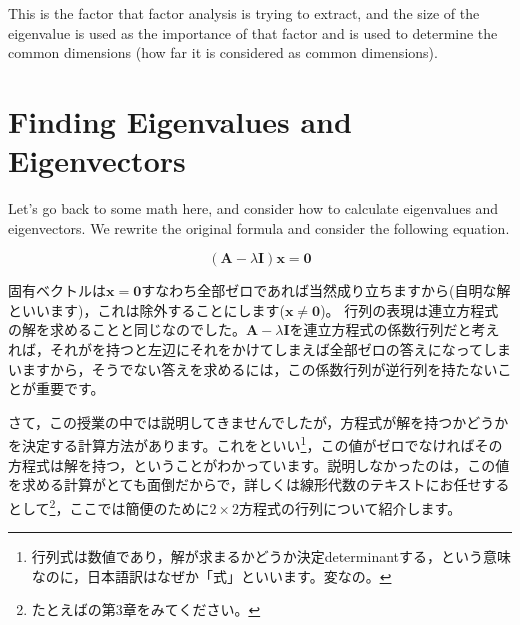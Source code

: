 \documentclass{ltjsbook}
\begin{document}
This is the factor that factor analysis is trying to extract, and the size of the eigenvalue is used as the importance of that factor and is used to determine the common dimensions (how far it is considered as common dimensions).

\section{Finding Eigenvalues and Eigenvectors}
Let's go back to some math here, and consider how to calculate eigenvalues and eigenvectors.
We rewrite the original formula and consider the following equation.

\[ (\bm{A} - \lambda\bm{I})\bm{x} = \bm{0} \]

固有ベクトルは$\bm{x}=\bm{0}$すなわち全部ゼロであれば当然成り立ちますから(自明な解といいます)，これは除外することにします($\bm{x}\neq \bm{0}$)。
行列の表現は連立方程式の解を求めることと同じなのでした。$\bm{A} - \lambda\bm{I}$を連立方程式の係数行列だと考えれば，それがを持つと左辺にそれをかけてしまえば全部ゼロの答えになってしまいますから，そうでない答えを求めるには，この係数行列が逆行列を持たないことが重要です。

さて，この授業の中では説明してきませんでしたが，方程式が解を持つかどうかを決定する計算方法があります。これをといい\footnote{行列式は数値であり，解が求まるかどうか決定determinantする，という意味なのに，日本語訳はなぜか「式」といいます。変なの。}，この値がゼロでなければその方程式は解を持つ，ということがわかっています。説明しなかったのは，この値を求める計算がとても面倒だからで，詳しくは線形代数のテキストにお任せするとして\footnote{たとえば\textcite{Murakami20160301}の第3章をみてください。}，ここでは簡便のために$2\times2$方程式の行列について紹介します。
\end{document}

